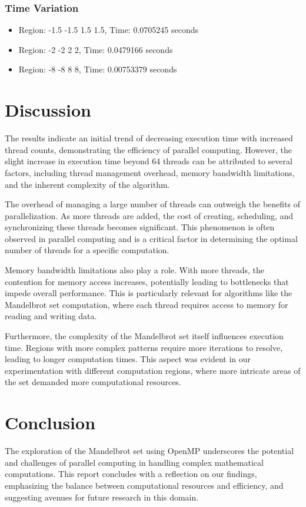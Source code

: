\documentclass[11pt]{article}
\begin{document}
\subsubsection{Time Variation}

\begin{itemize}
    \item Region: -1.5 -1.5 1.5 1.5, Time: 0.0705245 seconds
    \item Region: -2 -2 2 2, Time: 0.0479166 seconds
    \item Region: -8 -8 8 8, Time: 0.00753379 seconds
\end{itemize}

\section{Discussion}
The results indicate an initial trend of decreasing execution time with increased thread counts, demonstrating the efficiency of parallel computing. However, the slight increase in execution time beyond 64 threads can be attributed to several factors, including thread management overhead, memory bandwidth limitations, and the inherent complexity of the algorithm.

    The overhead of managing a large number of threads can outweigh the benefits of parallelization. As more threads are added, the cost of creating, scheduling, and synchronizing these threads becomes significant. This phenomenon is often observed in parallel computing and is a critical factor in determining the optimal number of threads for a specific computation.

    Memory bandwidth limitations also play a role. With more threads, the contention for memory access increases, potentially leading to bottlenecks that impede overall performance. This is particularly relevant for algorithms like the Mandelbrot set computation, where each thread requires access to memory for reading and writing data.

    Furthermore, the complexity of the Mandelbrot set itself influences execution time. Regions with more complex patterns require more iterations to resolve, leading to longer computation times. This aspect was evident in our experimentation with different computation regions, where more intricate areas of the set demanded more computational resources.

\section{Conclusion}
The exploration of the Mandelbrot set using OpenMP underscores the potential and challenges of parallel computing in handling complex mathematical computations. This report concludes with a reflection on our findings, emphasizing the balance between computational resources and efficiency, and suggesting avenues for future research in this domain.
\end{document}
